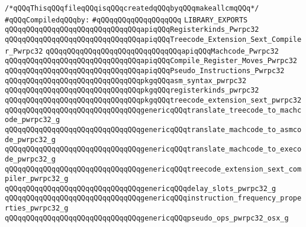 \label{src/lib/compiler/back/low/pwrpc32/backend-pwrpc32.lib}
\verb|/*qQQqThisqQQqfileqQQqisqQQqcreatedqQQqbyqQQqmakeallcmqQQq*/|\newline
\newline
\verb|#qQQqCompiledqQQqby:|\newline
\verb|#qQQqqQQqqQQqqQQqqQQq|\newline
\newline
\verb|LIBRARY_EXPORTS|\newline
\newline
\verb|qQQqqQQqqQQqqQQqqQQqqQQqqQQqqQQqapiqQQqRegisterkinds_Pwrpc32|\newline
\verb|qQQqqQQqqQQqqQQqqQQqqQQqqQQqqQQqapiqQQqTreecode_Extension_Sext_Compiler_Pwrpc32|\newline
\verb|qQQqqQQqqQQqqQQqqQQqqQQqqQQqqQQqapiqQQqMachcode_Pwrpc32|\newline
\verb|qQQqqQQqqQQqqQQqqQQqqQQqqQQqqQQqapiqQQqCompile_Register_Moves_Pwrpc32|\newline
\verb|qQQqqQQqqQQqqQQqqQQqqQQqqQQqqQQqapiqQQqPseudo_Instructions_Pwrpc32|\newline
\newline
\verb|qQQqqQQqqQQqqQQqqQQqqQQqqQQqqQQqpkgqQQqasm_syntax_pwrpc32|\newline
\verb|qQQqqQQqqQQqqQQqqQQqqQQqqQQqqQQqpkgqQQqregisterkinds_pwrpc32|\newline
\verb|qQQqqQQqqQQqqQQqqQQqqQQqqQQqqQQqpkgqQQqtreecode_extension_sext_pwrpc32|\newline
\newline
\verb|qQQqqQQqqQQqqQQqqQQqqQQqqQQqqQQqgenericqQQqtranslate_treecode_to_machcode_pwrpc32_g|\newline
\verb|qQQqqQQqqQQqqQQqqQQqqQQqqQQqqQQqgenericqQQqtranslate_machcode_to_asmcode_pwrpc32_g|\newline
\verb|qQQqqQQqqQQqqQQqqQQqqQQqqQQqqQQqgenericqQQqtranslate_machcode_to_execode_pwrpc32_g|\newline
\verb|qQQqqQQqqQQqqQQqqQQqqQQqqQQqqQQqgenericqQQqtreecode_extension_sext_compiler_pwrpc32_g|\newline
\verb|qQQqqQQqqQQqqQQqqQQqqQQqqQQqqQQqgenericqQQqdelay_slots_pwrpc32_g|\newline
\verb|qQQqqQQqqQQqqQQqqQQqqQQqqQQqqQQqgenericqQQqinstruction_frequency_properties_pwrpc32_g|\newline
\verb|qQQqqQQqqQQqqQQqqQQqqQQqqQQqqQQqgenericqQQqpseudo_ops_pwrpc32_osx_g|\newline
